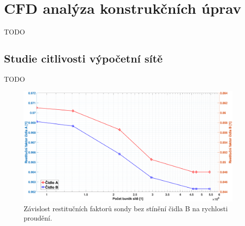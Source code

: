 \section{CFD analýza konstrukčních úprav} \label{sec:konstrukcni-upravy}
    TODO
    
    \subsection{Studie citlivosti výpočetní sítě}
        TODO

        \begin{table}[ht!]
            \centering
            \caption{Parametry síťování pro citlivostní analýzu sítě.}
            \label{tab:citlivost-site}
            \end{table}

        \begin{figure}[ht!]
            \centering
            \includegraphics*[width=\textwidth, trim={3.9cm 1.0cm 2.7cm 2.0cm}]{400_SIMULACE_KONSTRUKCNICH_UPRAV/Grafy/citlivost_site.eps}
            \caption{Závislost restitučních faktorů sondy bez stínění čidla B na rychlosti proudění.}
            \label{fig:citlivost-site}
        \end{figure}
    \newpage
